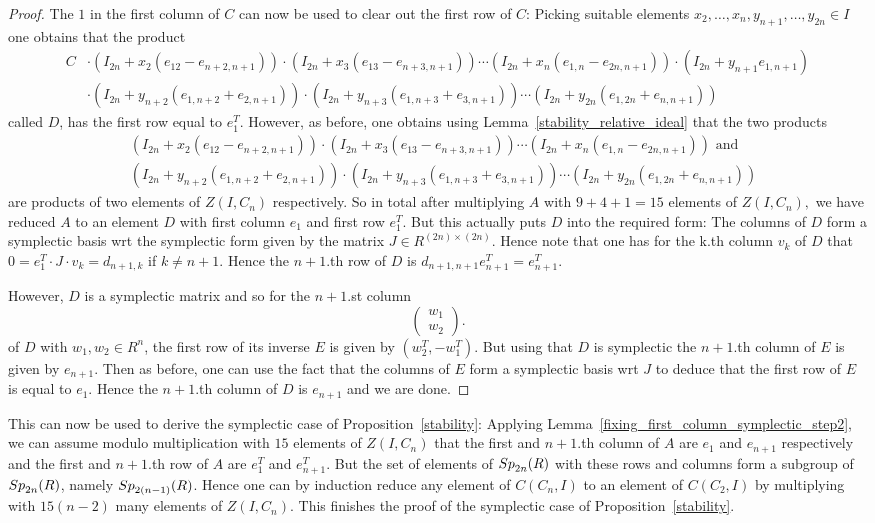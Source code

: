 \documentclass[12pt]{amsart}
\theoremstyle{definition}\newtheorem{definition}[theorem]{Definition}
\theoremstyle{remark}\newtheorem{remark}[theorem]{Remark}
\theoremstyle{definition}\newtheorem{case}{Case}
\begin{document}
\begin{proof}
The $1$ in the first column of $C$ can now be used to clear out the first row of $C$: Picking suitable elements $x_2,\dots,x_n,y_{n+1},\dots,y_{2n}\in I$ one obtains that the product
\begin{align*}
C&\cdot(I_{2n}+x_2(e_{12}-e_{n+2,n+1}))\cdot(I_{2n}+x_3(e_{13}-e_{n+3,n+1}))\cdots(I_{2n}+x_n(e_{1,n}-e_{2n,n+1}))\cdot(I_{2n}+y_{n+1}e_{1,n+1})\\
&\cdot (I_{2n}+y_{n+2}(e_{1,n+2}+e_{2,n+1}))\cdot (I_{2n}+y_{n+3}(e_{1,n+3}+e_{3,n+1}))\cdots(I_{2n}+y_{2n}(e_{1,2n}+e_{n,n+1}))
\end{align*}
called $D$, has the first row equal to $e_1^T.$ However, as before, one obtains using Lemma~\ref{stability_relative_ideal} that the two products 
\begin{align*}
&(I_{2n}+x_2(e_{12}-e_{n+2,n+1}))\cdot(I_{2n}+x_3(e_{13}-e_{n+3,n+1}))\cdots(I_{2n}+x_n(e_{1,n}-e_{2n,n+1}))
\text{ and }\\
&(I_{2n}+y_{n+2}(e_{1,n+2}+e_{2,n+1}))\cdot (I_{2n}+y_{n+3}(e_{1,n+3}+e_{3,n+1}))\cdots(I_{2n}+y_{2n}(e_{1,2n}+e_{n,n+1}))
\end{align*}
are products of two elements of $Z(I,C_n)$ respectively. So in total after multiplying $A$ with $9+4+1=15$ elements of $Z(I,C_n),$ we have reduced $A$ to an element $D$ with first column $e_1$ and first row $e_1^T.$ But this actually puts $D$ into the required form: The columns of $D$ form a symplectic basis wrt the symplectic form given by the matrix $J\in R^{(2n)\times (2n)}.$ Hence note that one has for the k.th column $v_k$ of $D$ that $0=e_1^T\cdot J\cdot v_k=d_{n+1,k}$ if $k\neq n+1.$ Hence the $n+1.$th row of $D$ is $d_{n+1,n+1}e_{n+1}^T=e_{n+1}^T.$ 

However, $D$ is a symplectic matrix and so for the $n+1.$st column
\[
\begin{pmatrix}
w_1\\
w_2
\end{pmatrix}.
\]
of $D$ with $w_1,w_2\in R^n$, the first row of its inverse $E$ is given by $(w_2^T,-w_1^T)$. But using that $D$ is symplectic the $n+1$.th column of $E$ is given by $e_{n+1}.$ Then as before, one can use the fact that the columns of $E$ form a symplectic basis wrt $J$ to deduce that the first row of $E$ is equal to $e_1$. Hence the $n+1.$th column of $D$ is $e_{n+1}$ and we are done. 
\end{proof}

This can now be used to derive the symplectic case of Proposition~\ref{stability}: Applying Lemma~\ref{fixing_first_column_symplectic_step2}, we can assume modulo multiplication with $15$ elements of $Z(I,C_n)$ that the first and $n+1$.th column of $A$ are $e_1$ and $e_{n+1}$ respectively and the first and $n+1.$th row of $A$ are $e_1^T$ and $e_{n+1}^T$. But the set of elements of ${\rm Sp}_{2n}(R)$ with these rows and columns form a subgroup of ${\rm Sp}_{2n}(R)$, namely ${\rm Sp}_{2(n-1)}(R)$. Hence one can by induction reduce any element of $C(C_n,I)$ to an element of $C(C_2,I)$ by multiplying with $15(n-2)$ many elements of $Z(I,C_n).$ This finishes the proof of the symplectic case of Proposition~\ref{stability}.
\end{document}
